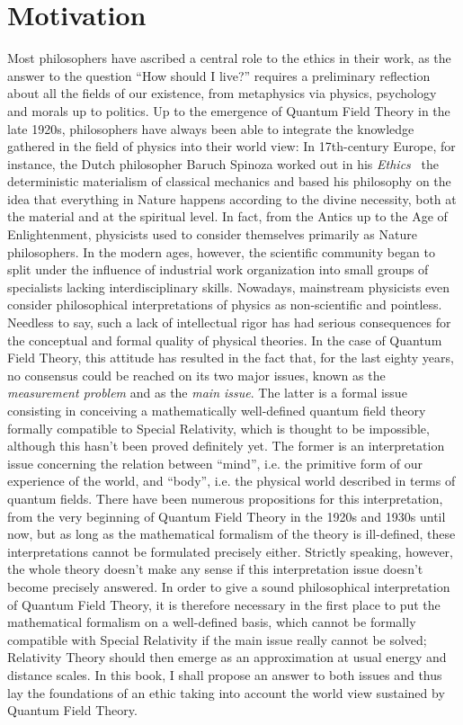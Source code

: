 \documentclass[10pt,a4paper,twoside,openany]{book}
\begin{document}
\section*{Motivation}

Most philosophers have ascribed a central role to the ethics in their work, as the answer to the question ``How should I live?'' requires a preliminary reflection about all the fields of our existence, from metaphysics via physics, psychology and morals up to politics. Up to the emergence of Quantum Field Theory in the late 1920s, philosophers have always been able to integrate the knowledge gathered in the field of physics into their world view: In 17th-century Europe, for instance, the Dutch philosopher Baruch Spinoza worked out in his \textit{Ethics}~\cite{Spinoza1677} the deterministic materialism of classical mechanics and based his philosophy on the idea that everything in Nature happens according to the divine necessity, both at the material and at the spiritual level. In fact, from the Antics up to the Age of Enlightenment, physicists used to consider themselves primarily as Nature philosophers. In the modern ages, however, the scientific community began to split under the influence of industrial work organization into small groups of specialists lacking interdisciplinary skills. Nowadays, mainstream physicists even consider philosophical interpretations of physics as non-scientific and pointless. Needless to say, such a lack of intellectual rigor has had serious consequences for the conceptual and formal quality of physical theories. In the case of Quantum Field Theory, this attitude has resulted in the fact that, for the last eighty years, no consensus could be reached on its two major issues, known as the \textit{measurement problem} and as the \textit{main issue}. The latter is a formal issue consisting in conceiving a mathematically well-defined quantum field theory formally compatible to Special Relativity\footnotemark[1], which is thought to be impossible, although this hasn't been proved definitely yet. The former is an interpretation issue concerning the relation between ``mind'', i.e. the primitive form of our experience of the world, and ``body'', i.e. the physical world described in terms of quantum fields. There have been numerous propositions for this interpretation, from the very beginning of Quantum Field Theory in the 1920s and 1930s until now, but as long as the mathematical formalism of the theory is ill-defined, these interpretations cannot be formulated precisely either. Strictly speaking, however, the whole theory doesn't make any sense if this interpretation issue doesn't become precisely answered. In order to give a sound philosophical interpretation of Quantum Field Theory, it is therefore necessary in the first place to put the mathematical formalism on a well-defined basis, which cannot be formally compatible with Special Relativity if the main issue really cannot be solved; Relativity Theory should then emerge as an approximation at usual energy and distance scales. In this book, I shall propose an answer to both issues and thus lay the foundations of an ethic taking into account the world view sustained by Quantum Field Theory.
\end{document}
